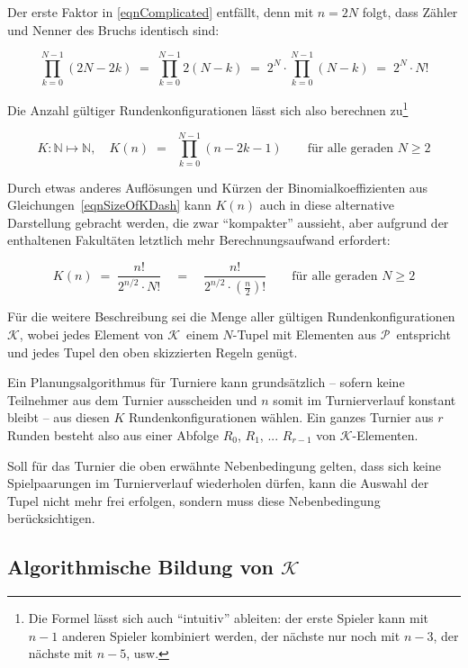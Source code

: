 \documentclass[DIV=15, 10pt]{scrartcl}
\newcommand{\PSet}{$\mathcal{P}$}
\newcommand{\KSet}{$\mathcal{K}$}
\begin{document}
Der erste Faktor in \eqref{eqnComplicated} entfällt, denn mit $n = 2N$ folgt, dass Zähler und Nenner des Bruchs identisch sind:

\begin{equation*}
\prod_{k=0}^{N-1}(2N - 2k) \; = \;
\prod_{k=0}^{N-1}2(N-k) \; = \;
2^N \cdot \prod_{k=0}^{N-1}(N-k) \; = \; 2^N \cdot N!
\end{equation*}

Die Anzahl gültiger Rundenkonfigurationen lässt sich also berechnen zu\footnote{Die Formel lässt sich auch "`intuitiv"' ableiten: der erste Spieler kann mit $n-1$ anderen Spieler kombiniert werden, der nächste nur noch mit $n-3$, der nächste mit $n-5$, usw.}

\begin{equation}\label{eqnSizeOfK}
K: \mathbb{N} \mapsto \mathbb{N}, \quad K(n) \; = \; \
\prod_{k=0}^{N-1}(n - 2k -1) \qquad \text{für alle geraden }N \geq 2
\end{equation}

Durch etwas anderes Auflösungen und Kürzen der Binomialkoeffizienten aus Gleichungen~\eqref{eqnSizeOfKDash} kann $K(n)$ auch in diese alternative Darstellung gebracht werden, die zwar "`kompakter"' aussieht, aber aufgrund der enthaltenen Fakultäten letztlich mehr Berechnungsaufwand erfordert:

\begin{equation}\label{eqnSizeOfK1}
K(n) \; = \; \frac{n!}{2^{n/2} \cdot N!} \quad = \quad \frac{n!}{2^{n/2} \cdot \left(\frac{n}{2}\right)!} \qquad \text{für alle geraden }N \geq 2
\end{equation}


Für die weitere Beschreibung sei die Menge aller gültigen Rundenkonfigurationen \KSet, wobei jedes Element von \KSet\ einem $N$-Tupel mit Elementen aus \PSet\ entspricht und jedes Tupel den oben skizzierten Regeln genügt.

Ein Planungsalgorithmus für Turniere kann grundsätzlich -- sofern keine Teilnehmer aus dem Turnier ausscheiden und $n$ somit im Turnierverlauf konstant bleibt -- aus diesen $K$ Rundenkonfigurationen wählen. Ein ganzes Turnier aus $r$ Runden besteht also aus einer Abfolge $R_0$, $R_1$, ... $R_{r-1}$ von \KSet -Elementen.

Soll für das Turnier die oben erwähnte Nebenbedingung gelten, dass sich keine Spielpaarungen im Turnierverlauf wiederholen dürfen, kann die Auswahl der Tupel nicht mehr frei erfolgen, sondern muss diese Nebenbedingung berücksichtigen.

\subsection{Algorithmische Bildung von \KSet}
\end{document}
